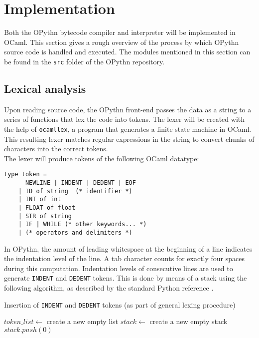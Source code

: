 \documentclass[11pt, twoside]{article}
\newcommand{\ms}{\texttt}
\begin{document}
\section{Implementation}
Both the OPythn bytecode compiler and interpreter will be implemented in OCaml. This section gives a rough overview of the process by which OPythn source code is handled and executed. The modules mentioned in this section can be found in the \ms{src} folder of the OPythn repository.
    \subsection{Lexical analysis}
    Upon reading source code, the OPythn front-end passes the data as a string to a series of functions that lex the code into tokens. The lexer will be created with the help of \texttt{ocamllex}, a program that generates a finite state machine in OCaml. This resulting lexer matches regular expressions in the string to convert chunks of characters into the correct tokens.\\
    \indent The lexer will produce tokens of the following OCaml datatype:
    \begin{lstlisting}[language=caml]
    type token =
      NEWLINE | INDENT | DEDENT | EOF
    | ID of string  (* identifier *)
    | INT of int
    | FLOAT of float
    | STR of string
    | IF | WHILE (* other keywords... *)
    | (* operators and delimiters *)
    \end{lstlisting}
    \indent In OPythn, the amount of leading whitespace at the beginning of a line indicates the indentation level of the line. A tab character counts for exactly four spaces during this computation. Indentation levels of consecutive lines are used to generate \ms{INDENT} and \ms{DEDENT} tokens. This is done by means of a stack using the following algorithm, as described by the standard Python reference \cite{pythonref}.
    \begin{algorithm}
    \caption{Insertion of \ms{INDENT} and \ms{DEDENT} tokens (as part of general lexing procedure)}
    \begin{algorithmic}[1]
        \State $token\_list \gets$ create a new empty list
        \State $stack \gets$ create a new empty stack
        \State $stack.push(0)$
    \end{algorithmic}
    \end{algorithm}
\end{document}
